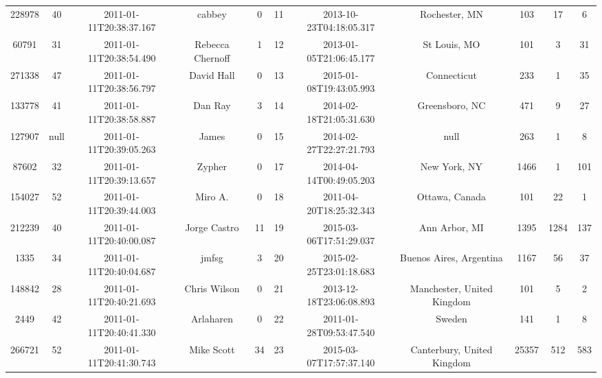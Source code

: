 \documentclass[12pt,a4paper,twoside,openright,titlepage,final]{article}
\begin{document}
\begin{enumerate}
\begin{table}[htbp!]
{\begin{tabular}{@{}ccccccccccc@{}}
			228978    & 40   & 2011-01-11T20:38:37.167 & cabbey                & 0         & 11    & 2013-10-23T04:18:05.317 & Rochester, MN                    & 103        & 17      & 6     \\
			60791     & 31   & 2011-01-11T20:38:54.490 & Rebecca Chernoff      & 1         & 12    & 2013-01-05T21:06:45.177 & St Louis, MO                     & 101        & 3       & 31    \\
			271338    & 47   & 2011-01-11T20:38:56.797 & David Hall            & 0         & 13    & 2015-01-08T19:43:05.993 & Connecticut                      & 233        & 1       & 35    \\
			133778    & 41   & 2011-01-11T20:38:58.887 & Dan Ray               & 3         & 14    & 2014-02-18T21:05:31.630 & Greensboro, NC                   & 471        & 9       & 27    \\
			127907    & null & 2011-01-11T20:39:05.263 & James                 & 0         & 15    & 2014-02-27T22:27:21.793 & null                             & 263        & 1       & 8     \\
			87602     & 32   & 2011-01-11T20:39:13.657 & Zypher                & 0         & 17    & 2014-04-14T00:49:05.203 & New York, NY                     & 1466       & 1       & 101   \\
			154027    & 52   & 2011-01-11T20:39:44.003 & Miro A.               & 0         & 18    & 2011-04-20T18:25:32.343 & Ottawa, Canada                   & 101        & 22      & 1     \\
			212239    & 40   & 2011-01-11T20:40:00.087 & Jorge Castro          & 11        & 19    & 2015-03-06T17:51:29.037 & Ann Arbor, MI                    & 1395       & 1284    & 137   \\
			1335      & 34   & 2011-01-11T20:40:04.687 & jmfsg                 & 3         & 20    & 2015-02-25T23:01:18.683 & Buenos Aires, Argentina          & 1167       & 56      & 37    \\
			148842    & 28   & 2011-01-11T20:40:21.693 & Chris Wilson          & 0         & 21    & 2013-12-18T23:06:08.893 & Manchester, United Kingdom       & 101        & 5       & 2     \\
			2449      & 42   & 2011-01-11T20:40:41.330 & Arlaharen             & 0         & 22    & 2011-01-28T09:53:47.540 & Sweden                           & 141        & 1       & 8     \\
			266721    & 52   & 2011-01-11T20:41:30.743 & Mike Scott            & 34        & 23    & 2015-03-07T17:57:37.140 & Canterbury, United Kingdom       & 25357      & 512     & 583   \\

\end{tabular}}
\end{table}
\end{enumerate}
\end{document}
